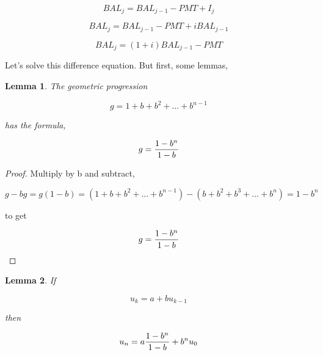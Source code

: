 \documentclass{article}
\newtheorem{lemma}{Lemma}[section]  %
\theoremstyle{definition} %
\theoremstyle{definition} %
\theoremstyle{remark} %
\begin{document}
\begin{equation}
BAL_j = BAL_{j-1} - PMT + I_j
\end{equation}

\begin{equation}
BAL_j = BAL_{j-1} - PMT + i BAL_{j-1}
\end{equation}

\begin{equation}
BAL_j = (1+i) BAL_{j-1} - PMT
\end{equation}

Let's solve this difference equation.  But first, some lemmas,

\begin{lemma}{}
The geometric progression

\begin{equation}
g = 1 +  b + b^2 + \ldots + b^{n-1}
\end{equation}

has the formula,

\begin{equation}
g = {{1 - b^n} \over {1 - b}}
\end{equation}

\end{lemma}

\begin{proof}

Multiply by b and subtract,

\begin{equation}
g - b g = g(1 - b) = \left( 1 +  b + b^2 + \ldots + b^{n-1}  \right) - \left( b +  b^2 + b^3 + \ldots + b^n \right) = 1 - b^n
\end{equation}

to get

\begin{equation}
g = {{1 - b^n} \over {1 - b}}
\end{equation}

\end{proof}

\begin{lemma}{}
 If

\begin{equation}
u_k = a + b u_{k-1}
\end{equation}

then 

\begin{equation}
u_n = a {1 - b^n  \over 1-b } + b^n u_0
\end{equation}

\end{lemma}
\end{document}
